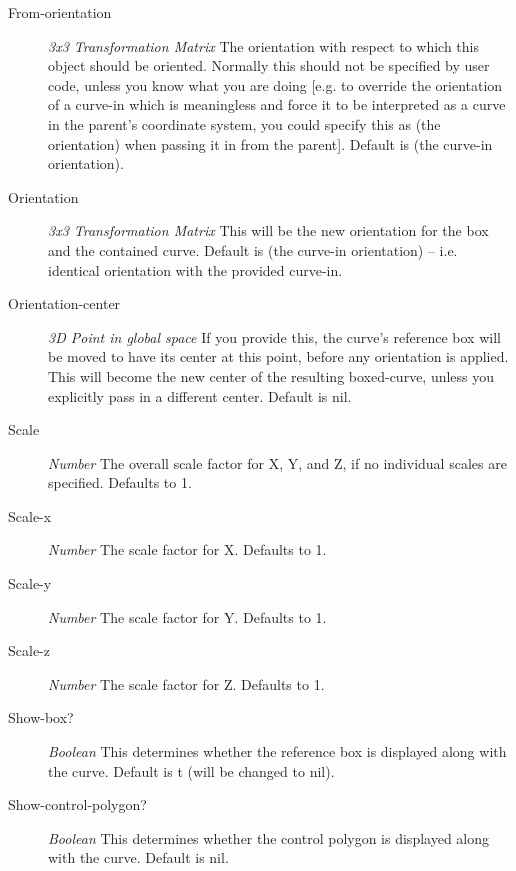 \documentclass [11pt]{book}
\begin{document}
\begin{itemize}
\begin{description}
\item [From-orientation]
\emph{3x3 Transformation Matrix} The orientation with respect to which this object should be oriented. Normally
this should not be specified by user code, unless you know what you are doing [e.g. to override the orientation
of a curve-in which is meaningless and force it to be interpreted as a curve in the parent's coordinate system,
you could specify this as (the orientation) when passing it in from the parent].
Default is (the curve-in orientation).


\item [Orientation]
\emph{3x3 Transformation Matrix} This will be the new orientation for the box and the contained curve. Default is
(the curve-in orientation) -- i.e. identical orientation with the provided curve-in.


\item [Orientation-center]
\emph{3D Point in global space} If you provide this, the curve's reference box will be moved to have its center
at this point, before any orientation is applied. This will become the new center of the resulting boxed-curve,
unless you explicitly pass in a different center. Default is nil.


\item [Scale]
\emph{Number} The overall scale factor for X, Y, and Z, if no individual scales are specified. Defaults to 1.


\item [Scale-x]
\emph{Number} The scale factor for X. Defaults to 1.


\item [Scale-y]
\emph{Number} The scale factor for Y. Defaults to 1.


\item [Scale-z]
\emph{Number} The scale factor for Z. Defaults to 1.


\item [Show-box?]
\emph{Boolean} This determines whether the reference box is displayed along with the curve. Default is t (will be changed to nil).


\item [Show-control-polygon?]
\emph{Boolean} This determines whether the control polygon is displayed along with the curve. Default is nil.



\end{description}
\end{itemize}
\end{document}
